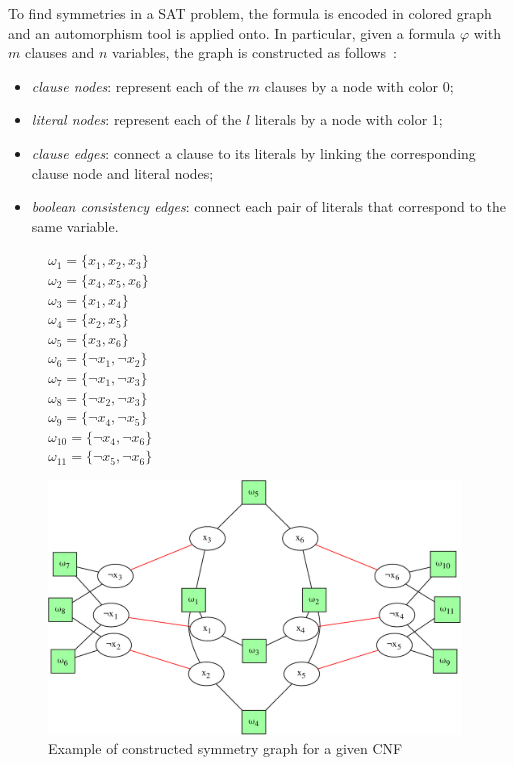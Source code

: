 To find symmetries in a SAT problem, the formula is encoded in colored graph
and an automorphism tool is applied onto. In particular, given a formula $\varphi$ with
$m$ clauses and $n$ variables, the graph is constructed as follows~\cite{biere2009handbook}:
\begin{itemize}
 \item \emph{clause nodes}: represent each of the $m$ clauses by a node with color 0;
 \item \emph{literal nodes}: represent each of the $l$ literals by a node with color 1;
 \item \emph{clause edges}: connect a clause to its literals by linking the corresponding  clause node and literal nodes;
 \item \emph{boolean consistency edges}: connect each pair of literals that correspond to the same variable.
\end{itemize}

\begin{figure}[!htbp]
 \begin{minipage}[c]{.2\textwidth}
  $\omega_{1} = \{ x_{1}, x_{2}, x_{3} \}$ \\
  $\omega_{2} = \{ x_{4}, x_{5}, x_{6} \}$ \\
  $\omega_{3} = \{ x_{1}, x_{4} \}$ \\
  $\omega_{4} = \{ x_{2}, x_{5} \}$ \\
  $\omega_{5} = \{ x_{3}, x_{6} \}$ \\
  $\omega_{6} = \{ \neg x_{1}, \neg x_{2} \}$ \\
  $\omega_{7} = \{ \neg x_{1}, \neg x_{3} \}$ \\
  $\omega_{8} = \{ \neg x_{2}, \neg x_{3} \}$ \\
  $\omega_{9} = \{ \neg x_{4}, \neg x_{5} \}$ \\
  $\omega_{10} = \{ \neg x_{4}, \neg x_{6} \}$ \\
  $\omega_{11} = \{ \neg x_{5}, \neg x_{6} \}$ \\
  
 \end{minipage}
 \begin{minipage}[l]{.75\textwidth}
  \includegraphics[width=4.3in]{cnfs/graph_cnf_no_opt-crop}
 \end{minipage}
 \caption{Example of constructed symmetry graph for a given CNF}
 \label{fig:graph_no_opt}
\end{figure}

